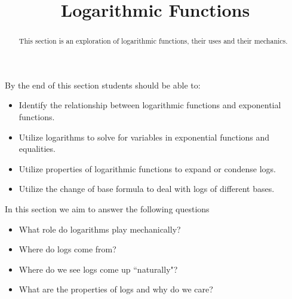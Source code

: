 \documentclass{ximeraXloud}
\title{Logarithmic Functions}
\begin{document}
\begin{abstract}
    This section is an exploration of logarithmic functions, their uses and their mechanics.
\end{abstract}
\maketitle
By the end of this section students should be able to:

\begin{itemize}
    \item Identify the relationship between logarithmic functions and exponential functions.
    \item Utilize logarithms to solve for variables in exponential functions and equalities.
    \item Utilize properties of logarithmic functions to expand or condense logs.
    \item Utilize the change of base formula to deal with logs of different bases.
\end{itemize}

In this section we aim to answer the following questions

\begin{itemize}
    \item What role do logarithms play mechanically?
    \item Where do logs come from?
    \item Where do we see logs come up ``naturally"?
    \item What are the properties of logs and why do we care?
\end{itemize}
\end{document}
